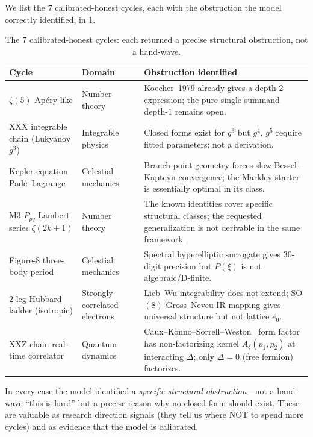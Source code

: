 \documentclass[11pt,reqno]{amsart}
\theoremstyle{definition}
\begin{document}
We list the $7$ calibrated-honest cycles, each with the obstruction
the model correctly identified, in \cref{tab:honest}.

\begin{table}[h!]
\centering
\renewcommand{\arraystretch}{1.25}
\begin{tabular}{>{\raggedright\arraybackslash}p{}
                >{\raggedright\arraybackslash}p{}
                >{\raggedright\arraybackslash}p{}}
\toprule
\textbf{Cycle} & \textbf{Domain} & \textbf{Obstruction identified} \\
\midrule
$\zeta(5)$ Ap\'ery-like & Number theory &
Koecher~1979 already gives a depth-$2$ expression; the pure
single-summand depth-$1$ remains open. \\
XXX integrable chain (Lukyanov $g^3$) & Integrable physics &
Closed forms exist for $g^3$ but $g^4$, $g^5$ require fitted
parameters; not a derivation. \\
Kepler equation Pad\'e--Lagrange & Celestial mechanics &
Branch-point geometry forces slow Bessel--Kapteyn convergence; the
Markley starter is essentially optimal in its class. \\
M3 $P_{pq}$ Lambert series $\zeta(2k+1)$ & Number theory &
The known identities cover specific structural classes; the
requested generalization is not derivable in the same framework. \\
Figure-8 three-body period & Celestial mechanics &
Spectral hyperelliptic surrogate gives $30$-digit precision but
$P(\xi)$ is not algebraic/D-finite. \\
$2$-leg Hubbard ladder (isotropic) & Strongly correlated electrons &
Lieb--Wu integrability does not extend; SO$(8)$ Gross--Neveu IR
mapping gives universal structure but not lattice $e_0$. \\
XXZ chain real-time correlator & Quantum dynamics &
Caux--Konno--Sorrell--Weston~\cite{CauxKonnoSorrellWeston2012} form
factor has non-factorizing kernel $A_\xi(p_1, p_2)$ at interacting
$\Delta$; only $\Delta = 0$ (free fermion) factorizes. \\
\bottomrule
\end{tabular}
\caption{The $7$ calibrated-honest cycles: each returned a precise
structural obstruction, not a hand-wave.}
\label{tab:honest}
\end{table}

In every case the model identified a \emph{specific structural
obstruction}---not a hand-wave ``this is hard'' but a precise reason
why no closed form should exist. These are valuable as research
direction signals (they tell us where NOT to spend more cycles) and
as evidence that the model is calibrated.
\end{document}
